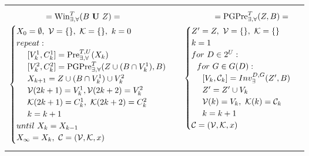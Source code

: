 \begin{table}
	\footnotesize
	\begin{tabular}{ll}
		\begin{minipage}{.5\textwidth}
			\begin{align}
			[X_{\infty},\mathcal{C}]= \text{Win}_{\exists,\forall}^{T} (B\mathbf{\ U\ }Z)=\quad\quad\quad\quad\quad\quad\ \ \nonumber\\
			\begin{cases}
			X_0 = \emptyset,\ \mathcal{V}=\{\},\ \mathcal{K}=\{\},\ {\color{black} k=0}\\
			{\color{black} repeat:}\\
			\ \ \ \ [V^1_k,C^1_k]=
			\text{Pre}_{\exists,\forall}^{T,U}(X_k)\\
			\ \ \ \  [V^2_k,C^2_k]=\text{PGPre}_{\exists,\forall}^{T}(Z\cup(B\cap V^1_k),B)\\
			\ \ \ \ X_{k+1} =Z\cup (B\cap V^1_k)\cup V^2_k\\
			\ \ \ \ \mathcal{V}(2k+1)=V^1_k, \mathcal{V}(2k+2)=V^2_k\\
			\ \ \ \ \mathcal{K}(2k+1)=C^1_k,\ \mathcal{K}(2k+2)=C^2_k\\
			\ \ \ \ {\color{black} k=k+1}\\
			{\color{black} until \ X_{k}= X_{k-1} }\\
			X_{\infty}=X_k,\ \mathcal{C} = (\mathcal{V},\mathcal{K},x)
			\end{cases}\label{win-until}
			\end{align}
		\end{minipage} &
		\begin{minipage}{.5\textwidth}
			\begin{align}
			[Z',\mathcal{C}]=\text{PGPre}_{\exists,\forall}^{T} (Z,B)=\quad \ \nonumber\\
			\begin{cases}
			Z' = Z,\ \mathcal{V} = \{\},\ \mathcal{K}=\{\}\\ k = 1\\
			for\ D\in 2^U:\\
			\ \ for\ G\in G(D):\\
			\ \ \ \ [V_k,\mathcal{C}_k]=Inv_{\exists}^{D,G}(Z',B)\\
			\ \ \ \  Z' = Z' \cup V_k\\
			\ \ \ \  \mathcal{V}(k)=V_k,\ \mathcal{K}(k)=\mathcal{C}_k\\
			\ \ \ \  {\color{black} k = k+1}\\
			\mathcal{C} = (\mathcal{V},\mathcal{K},x)
			\end{cases}\label{win-pgpre}
			\end{align}
		\end{minipage} 
	\end{tabular} 
\end{table}

